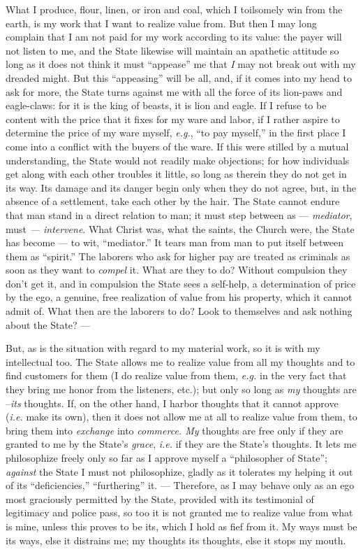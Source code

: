 What I produce, flour, linen, or iron and coal, which I toilsomely win from 
the earth, is my work that I want to realize value from. But then I may long 
complain that I am not paid for my work according to its value: the payer will 
not listen to me, and the State likewise will maintain an apathetic attitude 
so long as it does not think it must ``appease'' me that \textit{I} may not 
break out with my dreaded might. But this ``appeasing'' will be all, and, if 
it comes into my head to ask for more, the State turns against me with all the 
force of its lion-paws and eagle-claws: for it is the king of beasts, it is 
lion and eagle. If I refuse to be content with the price that it fixes for my 
ware and labor, if I rather aspire to determine the price of my ware myself, 
\textit{e.g.}, ``to pay myself,'' in the first place I come into a conflict 
with the buyers of the ware. If this were stilled by a mutual understanding, 
the State would not readily make objections; for how individuals get along 
with each other troubles it little, so long as therein they do not get in its 
way. Its damage and its danger begin only when they do not agree, but, in the 
absence of a settlement, take each other by the hair. The State cannot endure 
that man stand in a direct relation to man; it must step between as --- \textit{mediator}, must \textit{ --- intervene}. What Christ was, what the 
saints, the Church were, the State has become --- to wit, ``mediator.'' It 
tears man from man to put itself between them as ``spirit.'' The laborers 
who ask for higher pay are treated as criminals as soon as they want to 
\textit{compel} it. What are they to do? Without compulsion they don't get it, 
and in compulsion the State sees a self-help, a determination of price by the 
ego, a genuine, free realization of value from his property, which it cannot 
admit of. What then are the laborers to do? Look to themselves and ask nothing 
about the State? ---

But, as is the situation with regard to my material work, so it is with my 
intellectual too. The State allows me to realize value from all my thoughts 
and to find customers for them (I do realize value from them, \textit{e.g.} 
in the very fact that they bring me honor from the listeners, etc.); but only 
so long as \textit{my} thoughts are --\textit{its} thoughts. If, on the other 
hand, I harbor thoughts that it cannot approve (\textit{i.e.} make its own), 
then it does not allow me at all to realize value from them, to bring them 
into \textit{exchange} into \textit{commerce. My} thoughts are free only if 
they are granted to me by the State's \textit{grace}, \textit{i.e.} if they 
are the State's thoughts. It lets me philosophize freely only so far as I 
approve myself a ``philosopher of State''; \textit{against} the State I must 
not philosophize, gladly as it tolerates my helping it out of its 
``deficiencies,'' ``furthering'' it. --- Therefore, as I may behave only as 
an ego most graciously permitted by the State, provided with its testimonial 
of legitimacy and police pass, so too it is not granted me to realize value 
from what is mine, unless this proves to be its, which I hold as fief from it. 
My ways must be its ways, else it distrains me; my thoughts its thoughts, else 
it stops my mouth.

